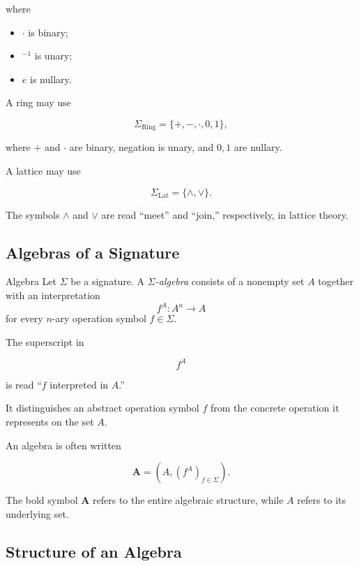 where

\begin{itemize}
    \item \(\cdot\) is binary;
    \item \(^{-1}\) is unary;
    \item \(e\) is nullary.
\end{itemize}

A ring may use

\[ \Sigma_{\mathrm{Ring}}=\{+,-,\cdot,0,1\}, \]

where \(+\) and \(\cdot\) are binary, negation is unary, and \(0,1\) are
nullary.

A lattice may use

\[ \Sigma_{\mathrm{Lat}}=\{\wedge,\vee\}. \]

The symbols \(\wedge\) and \(\vee\) are read ``meet'' and ``join,''
respectively, in lattice theory.

\subsection{Algebras of a Signature}
\label{subsec:algebras-signature}

\begin{definitionbox}{Algebra}
Let \(\Sigma\) be a signature. A \emph{\(\Sigma\)-algebra} consists of a
nonempty set \(A\) together with an interpretation
\[ f^A:A^n\to A \]
for every \(n\)-ary operation symbol \(f\in\Sigma\).
\end{definitionbox}

The superscript in

\[ f^A \]

is read ``\(f\) interpreted in \(A\).''

It distinguishes an abstract operation symbol \(f\) from the concrete
operation it represents on the set \(A\).

An algebra is often written

\[ \mathbf{A}=(A,(f^A)_{f\in\Sigma}). \]

The bold symbol \(\mathbf{A}\) refers to the entire algebraic structure,
while \(A\) refers to its underlying set.

\subsection{Structure of an Algebra}
\label{subsec:structure-of-algebra}

